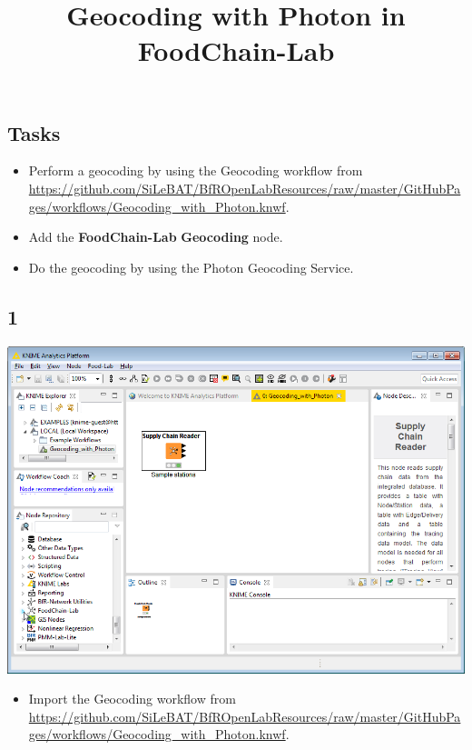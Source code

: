\documentclass{beamer}
\title{Geocoding with Photon in FoodChain-Lab}
\date{}
\begin{document}
\maketitle

\section{ }

\subsection{Tasks}
\begin{frame}
	\begin{itemize}
		\item Perform a geocoding by using the Geocoding workflow from \url{https://github.com/SiLeBAT/BfROpenLabResources/raw/master/GitHubPages/workflows/Geocoding_with_Photon.knwf}.
		\item Add the \textbf{FoodChain-Lab} \textbf{Geocoding} node.
		\item Do the geocoding by using the Photon Geocoding Service.
	\end{itemize}
\end{frame}
 
\subsection{1}
\begin{frame}
	\begin{center}
  		\includegraphics[height=0.6\textheight]{1.png}
	\end{center}
	\begin{itemize}
		\item Import the Geocoding workflow from \url{https://github.com/SiLeBAT/BfROpenLabResources/raw/master/GitHubPages/workflows/Geocoding_with_Photon.knwf}.
	\end{itemize}
\end{frame}
\end{document}
